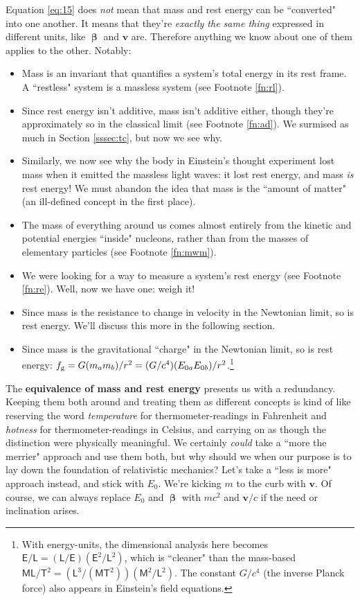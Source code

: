 \documentclass[12pt]{article}
\renewcommand{\vv}[1]{\mathbf{#1}}
\newcommand{\vvbeta}{\bm{\upbeta}}
\begin{document}
Equation \ref{eq:15} does \emph{not} mean that mass and rest energy can be ``converted" into one another. It means that they're \emph{exactly the same thing} expressed in different units, like $\vvbeta$ and $\vv v$ are. Therefore anything we know about one of them applies to the other. Notably:
\begin{itemize}
\item Mass is an invariant that quantifies a system's total energy in its rest frame. A ``restless" system is a massless system (see Footnote \ref{fn:rl}).
\item Since rest energy isn't additive, mass isn't additive either, though they're approximately so in the classical limit (see Footnote \ref{fn:ad}). We surmised as much in Section \ref{sssec:tc}, but now we see why.
\item Similarly, we now see why the body in Einstein's thought experiment lost mass when it emitted the massless light waves: it lost rest energy, and mass \emph{is} rest energy! We must abandon the idea that mass is the ``amount of matter" (an ill-defined concept in the first place).
\item The mass of everything around us comes almost entirely from the kinetic and potential energies ``inside" nucleons, rather than from the masses of elementary particles (see Footnote \ref{fn:mwm}).
\item We were looking for a way to measure a system's rest energy (see Footnote \ref{fn:re}). Well, now we have one: weigh it!
\item Since mass is the resistance to change in velocity in the Newtonian limit, so is rest energy. We'll discuss this more in the following section.
\item Since mass is the gravitational ``charge" in the Newtonian limit, so is rest energy: $f_{\mathrm{g}} = G(m_a m_b)/r^2 = (G/c^4)(E_{0 \mkern.5mu a} E_{0 \mkern.5mu b})/r^2$.\footnote{With energy-units, the dimensional analysis here becomes ${\mathsf{E}/\mathsf{L} = (\mathsf{L}/\mathsf{E}) (\mathsf{E}^2 / \mathsf{L}^{2})}$, which is ``cleaner" than the mass-based ${\mathsf{M}\mathsf{L}/\mathsf{T}^{2} = (\mathsf{L}^{3}/(\mathsf{M}\mathsf{T}^{2})) (\mathsf{M}^2/\mathsf{L}^{2})}$. The constant $G / c^4$ (the inverse Planck force) also appears in Einstein's field equations.}
\end{itemize}

The \textbf{equivalence of mass and rest energy} presents us with a redundancy. Keeping them both around and treating them as different concepts is kind of like reserving the word \emph{temperature} for thermometer-readings in Fahrenheit and \emph{hotness} for thermometer-readings in Celsius, and carrying on as though the distinction were physically meaningful. We certainly \emph{could} take a ``more the merrier" approach and use them both, but why should we when our purpose is to lay down the foundation of relativistic mechanics? Let's take a ``less is more" approach instead, and stick with $E_0$. We're kicking $m$ to the curb with $\vv v$. Of course, we can always replace $E_0$ and $\vvbeta$ with $mc^2$ and $\vv v/c$ if the need or inclination arises.
\end{document}
